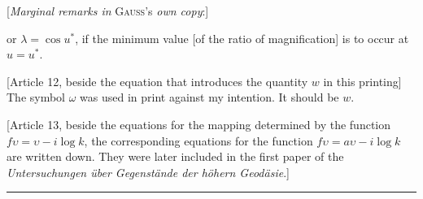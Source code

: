 \par\bigskip{}
\begin{center}[\textit{Marginal remarks in} \textsc{Gauss}'s \textit{own copy}:]\end{center}
\begingroup\small
\par{} or \(\lambda=\cos u^*\), if the minimum value [of the ratio of magnification] is to occur at \(u=u^*\).

[Article 12, beside the equation that introduces the quantity \(w\) in this printing] The symbol \(\omega\) was used in print against my intention. It should be \(w\).

[Article 13, beside the equations for the mapping determined by the function \(f\upsilon=\upsilon-i\log k\), the corresponding equations for the function \(f\upsilon=a\upsilon-i\log k\) are written down. They were later included in the first paper of the \textit{Untersuchungen über Gegenstände der höhern Geodäsie}.]
\par\endgroup
\begin{center}\rule{1.2in}{.3pt}\end{center}
